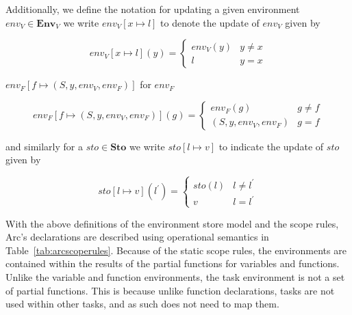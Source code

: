 Additionally, we define the notation for updating a given environment $env_V \in \textbf{Env}_V$ we write $env_V[ x \mapsto l]$ to denote the update of $env_V$ given by


\begin{equation}
    env_V[x \mapsto l](y) =
    \begin{cases}
        env_V(y) & y \neq x \\
        l        & y = x
    \end{cases}
\end{equation}


\noindent $env_F[ f \mapsto (S, y, env_V, env_F)]$ for $env_F$


\begin{equation}
    env_F[f \mapsto (S, y, env_V, env_F)](g) =
    \begin{cases}
        env_F(g)             & g \neq f \\
        (S, y, env_V, env_F) & g = f
    \end{cases}
\end{equation}


\noindent and similarly for a $sto \in \textbf{Sto}$ we write $sto[ l \mapsto v ]$ to indicate the update of $sto$ given by


\begin{equation}
    sto[l \mapsto v](l^\prime) =
    \begin{cases}
        sto(l) & l \neq l^\prime \\
        v      & l = l^\prime
    \end{cases}
\end{equation}


\noindent With the above definitions of the environment store model and the scope rules, Arc's declarations are described using operational semantics in Table~\ref{tab:arcscoperules}. Because of the static scope rules, the environments are contained within the results of the partial functions for variables and functions. Unlike the variable and function environments, the task environment is not a set of partial functions. This is because unlike function declarations, tasks are not used within other tasks, and as such does not need to map them.


